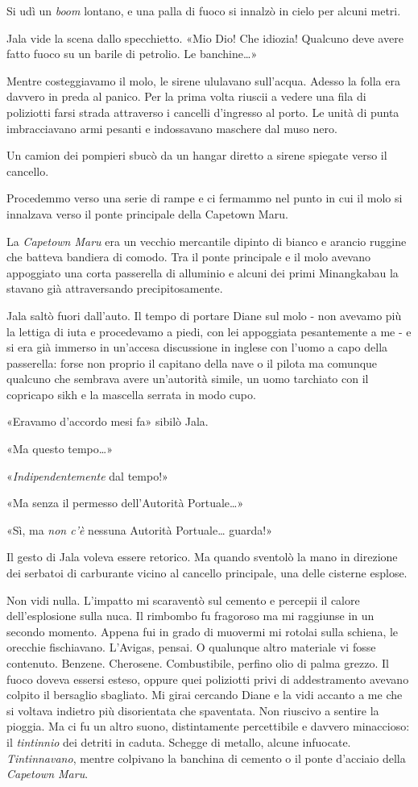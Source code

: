 Si udì un \emph{boom} lontano, e una palla di fuoco si innalzò in cielo
per alcuni metri.

Jala vide la scena dallo specchietto. «Mio Dio! Che idiozia! Qualcuno
deve avere fatto fuoco su un barile di petrolio. Le banchine\ldots»

Mentre costeggiavamo il molo, le sirene ululavano sull'acqua. Adesso la
folla era davvero in preda al panico. Per la prima volta riuscii a
vedere una fila di poliziotti farsi strada attraverso i cancelli
d'ingresso al porto. Le unità di punta imbracciavano armi pesanti e
indossavano maschere dal muso nero.

Un camion dei pompieri sbucò da un hangar diretto a sirene spiegate
verso il cancello.

Procedemmo verso una serie di rampe e ci fermammo nel punto in cui il
molo si innalzava verso il ponte principale della Capetown Maru.

La \emph{Capetown Maru} era un vecchio mercantile dipinto di bianco e
arancio ruggine che batteva bandiera di comodo. Tra il ponte principale
e il molo avevano appoggiato una corta passerella di alluminio e alcuni
dei primi Minangkabau la stavano già attraversando precipitosamente.

Jala saltò fuori dall'auto. Il tempo di portare Diane sul molo - non
avevamo più la lettiga di iuta e procedevamo a piedi, con lei appoggiata
pesantemente a me - e si era già immerso in un'accesa discussione in
inglese con l'uomo a capo della passerella: forse non proprio il
capitano della nave o il pilota ma comunque qualcuno che sembrava avere
un'autorità simile, un uomo tarchiato con il copricapo sikh e la
mascella serrata in modo cupo.

«Eravamo d'accordo mesi fa» sibilò Jala.

«Ma questo tempo\ldots»

«\emph{Indipendentemente} dal tempo!»

«Ma senza il permesso dell'Autorità Portuale\ldots»

«Sì, ma \emph{non c'è} nessuna Autorità Portuale\ldots{} guarda!»

Il gesto di Jala voleva essere retorico. Ma quando sventolò la mano in
direzione dei serbatoi di carburante vicino al cancello principale, una
delle cisterne esplose.

Non vidi nulla. L'impatto mi scaraventò sul cemento e percepii il calore
dell'esplosione sulla nuca. Il rimbombo fu fragoroso ma mi raggiunse in
un secondo momento. Appena fui in grado di muovermi mi rotolai sulla
schiena, le orecchie fischiavano. L'Avigas, pensai. O qualunque altro
materiale vi fosse contenuto. Benzene. Cherosene. Combustibile, perfino
olio di palma grezzo. Il fuoco doveva essersi esteso, oppure quei
poliziotti privi di addestramento avevano colpito il bersaglio
sbagliato. Mi girai cercando Diane e la vidi accanto a me che si voltava
indietro più disorientata che spaventata. Non riuscivo a sentire la
pioggia. Ma ci fu un altro suono, distintamente percettibile e davvero
minaccioso: il \emph{tintinnio} dei detriti in caduta. Schegge di
metallo, alcune infuocate. \emph{Tintinnavano}, mentre colpivano la
banchina di cemento o il ponte d'acciaio della \emph{Capetown Maru}.

